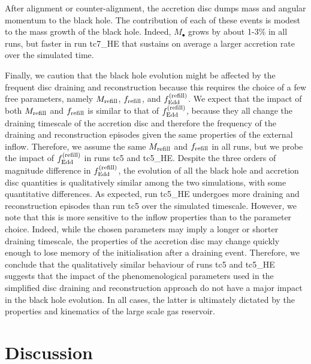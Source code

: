 \documentclass[a4paper,fleqn,usenatbib]{mnras}
\begin{document}
After alignment or counter-alignment, the accretion disc dumps mass and angular momentum to the black hole.
The contribution of each of these events is modest to the mass growth of the black hole.
Indeed, $M_{\bullet}$ grows by about 1-3\% in all runs, but faster in run tc7\_HE that sustains on average a larger accretion rate over the simulated time.

Finally, we caution that the black hole evolution might be affected by the frequent disc draining and reconstruction because this requires the choice of
a few free parameters, namely $M_{\rm refill}$, $f_{\rm refill}$, and $f_{\rm Edd}^{\rm (refill)}$.
We expect that the impact of both $M_{\rm refill}$ and $f_{\rm refill}$ is similar to that of $f_{\rm Edd}^{\rm (refill)}$, because they all change the draining timescale of the accretion disc and therefore the frequency of the draining and reconstruction episodes given the same properties of the external inflow.
Therefore, we assume the same $M_{\rm refill}$ and $f_{\rm refill}$ in all runs, but we probe the impact of $f_{\rm Edd}^{\rm (refill)}$ in runs tc5 and tc5\_HE.
Despite the three orders of magnitude difference in $f_{\rm Edd}^{\rm (refill)}$, the evolution of all the black hole and accretion disc quantities is qualitatively similar among the two simulations, with some quantitative differences.
As expected, run tc5\_HE undergoes more draining and reconstruction episodes than run tc5 over the simulated timescale.
However, we note that this is more sensitive to the inflow properties than to the parameter choice.
Indeed, while the chosen parameters may imply a longer or shorter draining timescale, the properties of the accretion disc may change quickly enough to lose memory of the initialisation after a draining event.
Therefore, we conclude that the qualitatively similar behaviour of runs tc5 and tc5\_HE suggests that the impact of the phenomenological parameters used in the simplified disc draining and reconstruction approach do not have a major impact in the black hole evolution.
In all cases, the latter is ultimately dictated by the properties and kinematics of the large scale gas reservoir.


\section{Discussion} \label{sec_discussion}
\end{document}
